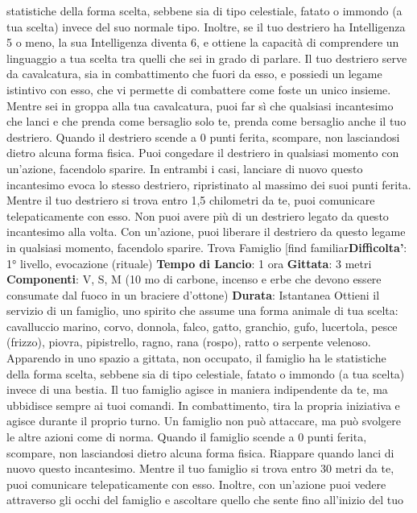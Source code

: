 \begin{multicols}{2}
statistiche della forma scelta, sebbene sia di tipo
celestiale, fatato o immondo (a tua scelta) invece del
suo normale tipo. Inoltre, se il tuo destriero ha
Intelligenza 5 o meno, la sua Intelligenza diventa 6, e
ottiene la capacità di comprendere un linguaggio a tua
scelta tra quelli che sei in grado di parlare.
Il tuo destriero serve da cavalcatura, sia in
combattimento che fuori da esso, e possiedi un legame
istintivo con esso, che vi permette di combattere come
foste un unico insieme. Mentre sei in groppa alla tua
cavalcatura, puoi far sì che qualsiasi incantesimo che
lanci e che prenda come bersaglio solo te, prenda
come bersaglio anche il tuo destriero.
Quando il destriero scende a 0 punti ferita, scompare,
non lasciandosi dietro alcuna forma fisica. Puoi
congedare il destriero in qualsiasi momento con
un’azione, facendolo sparire. In entrambi i casi, lanciare
di nuovo questo incantesimo evoca lo stesso destriero,
ripristinato al massimo dei suoi punti ferita.
Mentre il tuo destriero si trova entro 1,5 chilometri da te,
puoi comunicare telepaticamente con esso.
Non puoi avere più di un destriero legato da questo
incantesimo alla volta. Con un’azione, puoi liberare il
destriero da questo legame in qualsiasi momento,
facendolo sparire.
Trova Famiglio
[find familiar\textbf{Difficolta'}:
1° livello, evocazione (rituale)
\textbf{Tempo di Lancio}: 1 ora
\textbf{Gittata}: 3 metri
\textbf{Componenti}: V, S, M (10 mo di carbone, incenso e
erbe che devono essere consumate dal fuoco in un
braciere d’ottone)
\textbf{Durata}: Istantanea
Ottieni il servizio di un famiglio, uno spirito che assume
una forma animale di tua scelta: cavalluccio marino,
corvo, donnola, falco, gatto, granchio, gufo, lucertola,
pesce (frizzo), piovra, pipistrello, ragno, rana (rospo),
ratto o serpente velenoso. Apparendo in uno spazio a
gittata, non occupato, il famiglio ha le statistiche della
forma scelta, sebbene sia di tipo celestiale, fatato o
immondo (a tua scelta) invece di una bestia.
Il tuo famiglio agisce in maniera indipendente da te, ma
ubbidisce sempre ai tuoi comandi. In combattimento,
tira la propria iniziativa e agisce durante il proprio turno.
Un famiglio non può attaccare, ma può svolgere le altre
azioni come di norma.
Quando il famiglio scende a 0 punti ferita, scompare,
non lasciandosi dietro alcuna forma fisica. Riappare
quando lanci di nuovo questo incantesimo.
Mentre il tuo famiglio si trova entro 30 metri da te, puoi
comunicare telepaticamente con esso. Inoltre, con
un’azione puoi vedere attraverso gli occhi del famiglio e
ascoltare quello che sente fino all’inizio del tuo

\end{multicols}
